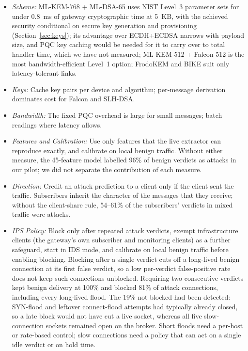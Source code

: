 \documentclass[journal]{IEEEtran}
\begin{document}
\begin{itemize}
  \item \textit{Scheme:} ML-KEM-768 + ML-DSA-65 uses NIST Level~3 parameter sets for under 0.8~ms of gateway cryptographic time at 5~KB, with the achieved security conditional on secure key generation and provisioning (Section~\ref{sec:keys}); its advantage over ECDH+ECDSA narrows with payload size, and PQC key caching would be needed for it to carry over to total handler time, which we have not measured; ML-KEM-512 + Falcon-512 is the most bandwidth-efficient Level~1 option; FrodoKEM and BIKE suit only latency-tolerant links.
  \item \textit{Keys:} Cache key pairs per device and algorithm; per-message derivation dominates cost for Falcon and SLH-DSA.
  \item \textit{Bandwidth:} The fixed PQC overhead is large for small messages; batch readings where latency allows.
  \item \textit{Features and Calibration:} Use only features that the live extractor can reproduce exactly, and calibrate on local benign traffic. Without either measure, the 45-feature model labelled 96\% of benign verdicts as attacks in our pilot; we did not separate the contribution of each measure.
  \item \textit{Direction:} Credit an attack prediction to a client only if the client sent the traffic. Subscribers inherit the character of the messages that they receive; without the client-share rule, 54--61\% of the subscribers' verdicts in mixed traffic were attacks.
  \item \textit{IPS Policy:} Block only after repeated attack verdicts, exempt infrastructure clients (the gateway's own subscriber and monitoring clients) as a further safeguard, start in IDS mode, and calibrate on local benign traffic before enabling blocking. Blocking after a single verdict cuts off a long-lived benign connection at its first false verdict, so a low per-verdict false-positive rate does not keep such connections unblocked. Requiring two consecutive verdicts kept benign delivery at 100\% and blocked 81\% of attack connections, including every long-lived flood. The 19\% not blocked had been detected: SYN-flood and leftover connect-flood attempts had typically already closed, so a late block would not have cut a live socket, whereas all five slow-connection sockets remained open on the broker. Short floods need a per-host or rate-based control; slow connections need a policy that can act on a single idle verdict or on hold time.
\end{itemize}
\end{document}
